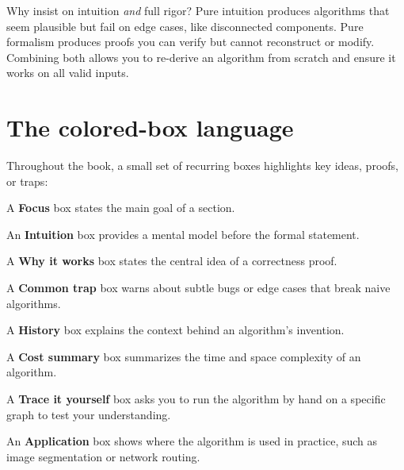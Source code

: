 \begin{whybox}
Why insist on intuition \emph{and} full rigor? Pure intuition produces algorithms that seem plausible but fail on edge cases, like disconnected components. Pure formalism produces proofs you can verify but cannot reconstruct or modify. Combining both allows you to re-derive an algorithm from scratch and ensure it works on all valid inputs.
\end{whybox}

\section*{The colored-box language}

Throughout the book, a small set of recurring boxes highlights key ideas, proofs, or traps:

\begin{focusbox}
A \textbf{Focus} box states the main goal of a section.
\end{focusbox}

\begin{intuitionbox}
An \textbf{Intuition} box provides a mental model before the formal statement.
\end{intuitionbox}

\begin{whybox}
A \textbf{Why it works} box states the central idea of a correctness proof.
\end{whybox}

\begin{trapbox}
A \textbf{Common trap} box warns about subtle bugs or edge cases that break naive algorithms.
\end{trapbox}

A \textbf{History} box explains the context behind an algorithm's invention.

\begin{complexitybox}
A \textbf{Cost summary} box summarizes the time and space complexity of an algorithm.
\end{complexitybox}

\begin{labbox}
A \textbf{Trace it yourself} box asks you to run the algorithm by hand on a specific graph to test your understanding.
\end{labbox}

\begin{applicationbox}
An \textbf{Application} box shows where the algorithm is used in practice, such as image segmentation or network routing.
\end{applicationbox}

